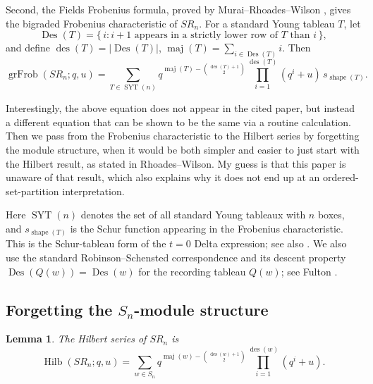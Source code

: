 \documentclass[12pt]{article}
\newtheorem{lemma}[theorem]{Lemma}
\DeclareMathOperator{\Hilb}{Hilb}
\DeclareMathOperator{\grFrob}{grFrob}
\DeclareMathOperator{\Des}{Des}
\DeclareMathOperator{\des}{des}
\DeclareMathOperator{\maj}{maj}
\DeclareMathOperator{\shape}{shape}
\newcommand{\SYT}{\operatorname{SYT}}
\newcommand{\review}[1]{\begin{reviewbox}#1\end{reviewbox}}
\begin{document}
Second, the Fields Frobenius formula, proved by Murai--Rhoades--Wilson \cite{MRW2025}, gives the bigraded Frobenius characteristic of \(SR_n\).  For a standard Young tableau \(T\), let
\[
\Des(T)=\{\,i: i+1 \text{ appears in a strictly lower row of }T\text{ than }i\,\},
\]
and define \(\des(T)=|\Des(T)|\), \(\maj(T)=\sum_{i\in\Des(T)}i\).  Then
\begin{equation}\label{eq:fields}
\grFrob(SR_n;q,u)
=
\sum_{T\in \SYT(n)}
q^{\maj(T)-\binom{\des(T)+1}{2}}
\prod_{i=1}^{\des(T)}(q^i+u)\,
s_{\shape(T)}.
\end{equation}

\review{Interestingly, the above equation does not appear in the cited paper, but instead a different equation that can be shown to be the same via a routine calculation. Then we pass from the Frobenius characteristic to the Hilbert series by forgetting the module structure, when it would be both simpler and easier to just start with the Hilbert result, as stated in Rhoades--Wilson. My guess is that this paper is unaware of that result, which also explains why it does not end up at an ordered-set-partition interpretation.}


Here \(\SYT(n)\) denotes the set of all standard Young tableaux with \(n\) boxes, and \(s_{\shape(T)}\) is the Schur function appearing in the Frobenius characteristic.  This is the Schur-tableau form of the \(t=0\) Delta expression; see also \cite{HRS2019}.  We also use the standard Robinson--Schensted correspondence and its descent property \(\Des(Q(w))=\Des(w)\) for the recording tableau \(Q(w)\); see Fulton \cite{Fulton1997}.

\subsection{Forgetting the \(S_n\)-module structure}

\begin{lemma}\label{lem:permutation-hilbert}
The Hilbert series of \(SR_n\) is
\[
\Hilb(SR_n;q,u)
=
\sum_{w\in S_n}
q^{\maj(w)-\binom{\des(w)+1}{2}}
\prod_{i=1}^{\des(w)}(q^i+u).
\]
\end{lemma}
\end{document}
